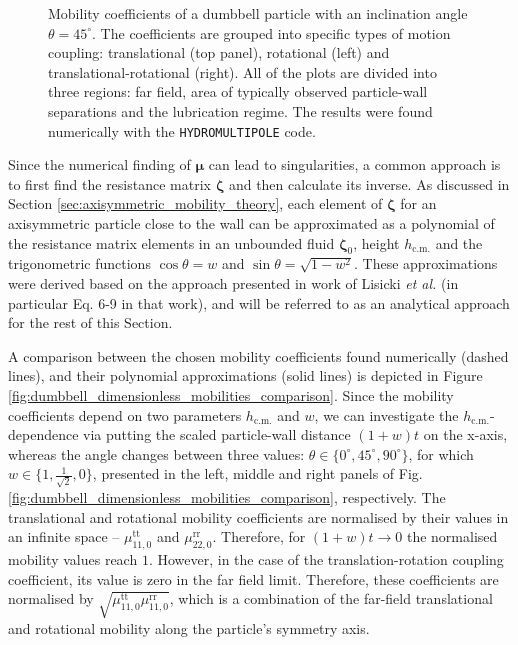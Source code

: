 \documentclass{master_thesis}
\def\code#1{\texttt{#1}}
\begin{document}
\begin{figure}
    \centering
    
    \caption{Mobility coefficients of a dumbbell particle with an inclination angle $\theta=45^{\circ}$. The coefficients are grouped into specific types of motion coupling: translational (top panel), rotational (left) and translational-rotational (right). All of the plots are divided into three regions: far field, area of typically observed particle-wall separations and the lubrication regime. The results were found numerically with the \code{HYDROMULTIPOLE} code.}
    \label{fig:dumbbell_mobilities_comparison}
\end{figure}

Since the numerical finding of $\bm{\mu}$ can lead to singularities, a common approach is to first find the resistance matrix $\bm{\zeta}$ and then calculate its inverse. As discussed in Section \ref{sec:axisymmetric_mobility_theory}, each element of $\bm{\zeta}$ for an axisymmetric particle close to the wall can be approximated as a polynomial of the resistance matrix elements in an unbounded fluid $\bm{\zeta}_0$, height $h_{\textrm{c.m.}}$ and the trigonometric functions $\cos\theta = w$ and $\sin\theta = \sqrt{1 - w^2}$. These approximations were derived based on the approach presented in work of Lisicki \textit{et al.} \cite{lisicki2016} (in particular Eq. 6-9 in that work), and will be referred to as an analytical approach for the rest of this Section.

A comparison between the chosen mobility coefficients found numerically (dashed lines), and their polynomial approximations (solid lines) is depicted in Figure \ref{fig:dumbbell_dimensionless_mobilities_comparison}. Since the mobility coefficients depend on two parameters $h_{\textrm{c.m.}}$ and $w$, we can investigate the $h_{\textrm{c.m.}}$-dependence via putting the scaled particle-wall distance $(1+w)t$ on the x-axis, whereas the angle changes between three values: $\theta\in\{0^{\circ}, 45^{\circ}, 90^{\circ}\}$, for which $w\in\{ 1, \frac{1}{\sqrt{2}}, 0 \}$, presented in the left, middle and right panels of Fig. \ref{fig:dumbbell_dimensionless_mobilities_comparison}, respectively. The translational and rotational mobility coefficients are normalised by their values in an infinite space -- $\mu_{11,0}^{\textrm{tt}}$ and $\mu_{22,0}^{\textrm{rr}}$. Therefore, for $(1+w)t\rightarrow 0$ the normalised mobility values reach $1$. However, in the case of the translation-rotation coupling coefficient, its value is zero in the far field limit. Therefore, these coefficients are normalised by $\sqrt{\mu_{11,0}^{\textrm{tt}}\mu_{11,0}^{\textrm{rr}}}$, which is a combination of the far-field translational and rotational mobility along the particle's symmetry axis.
\end{document}
